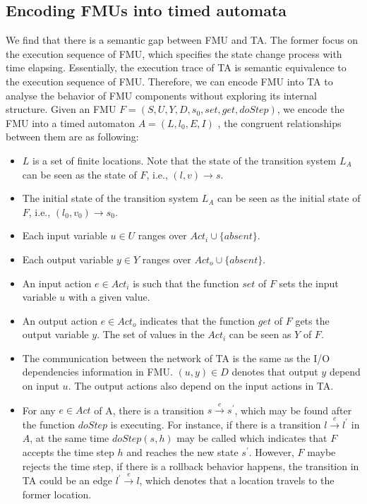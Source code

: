 \subsection{Encoding FMUs into timed automata}
We find that there is a semantic gap between FMU and TA. The former focus on the execution sequence of FMU, which specifies the state change process with time elapsing. Essentially, the execution trace of TA is semantic equivalence to the execution sequence of FMU. Therefore, we can encode FMU into TA to analyse the behavior of FMU components without exploring its internal structure. 
Given an FMU $F=(S,U,Y,D,s_{0},set,get,doStep)$, we encode the FMU into a timed automaton $\textit{A}=(L,l_{0},E,I)$ , the congruent relationships between them are as following:
\begin{itemize}
\item
$L$ is a set of finite locations. Note that the state of the transition system $L_{\textit{A}}$ can be seen as the state of $F$, i.e., $(l,v) \rightarrow s$.
\item
The initial state of the transition system $L_{\textit{A}}$ can be seen as the initial state of $F$, i.e., $(l_{0},v_{0}) \rightarrow s_{0}$. 
\item
Each input variable $u \in U$ ranges over $Act_{i} \cup \{absent\}$.
\item
Each output variable $y \in Y$ ranges over $Act_{o} \cup \{absent\}$.
\item
An input action $e \in Act_{i}$ is such that the function $set$ of $F$ sets the input variable $u$ with a given value. 
\item
An output action $e \in Act_{o}$ indicates that the function $get$ of $F$ gets the output variable $y$. The set of values in the $Act_{i}$ can be seen as $Y$ of $F$.  
\item
The communication between the network of TA is the same as the I/O dependencies information in FMU. $(u,y) \in D$ denotes that output $y$ depend on input $u$. The output actions also depend on the input actions in TA.
\item
For any $e \in Act$ of A, there is a transition $s \xrightarrow{e} s^{\prime}$, which may be found after the function $doStep$ is executing. For instance, if there is a transition $l \xrightarrow{e} l^{\prime}$ in $A$, at the same time $doStep(s,h)$ may be called which indicates that $F$ accepts the time step $h$ and reaches the new state $s^{\prime}$. However, $F$ maybe rejects the time step, if there is a rollback behavior happens, the transition in TA could be an edge $l^{\prime} \xrightarrow{e} l$, which denotes that a location travels to the former location.

\end{itemize}
